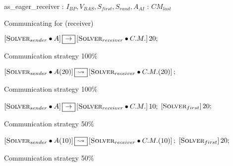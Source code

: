 \begin{algorithm}[t]
\dontprintsemicolon
\SetNoline
{}
   as\_eager\_receiver\;
\algoindent {} : $I_{BP}, V_{BAS}, S_{first}, S_{rand}, A_{AI}$ \;
\algoindent {} : $CM_{last}$
\caption{Communicating \as{} for \SGP{} (receiver)}\label{as:golfers_receiver}
\end{algorithm}

\begin{algorithm}[h]
\dontprintsemicolon
\SetNoline
$\left[\eqsolverposl{sender}\posldot A\right] \onetoone \left[\eqsolverposl{receiver}\posldot C.M.\right]20;$
\caption{Communication strategy \oneTone{} 100\%}\label{comm:golfers_1_1-1}
\end{algorithm}

\begin{algorithm}[h]
\dontprintsemicolon
\SetNoline
$\left[\eqsolverposl{sender}\posldot A(20)\right] \oneton \left[\eqsolverposl{receiver}\posldot C.M.(20)\right];$
\caption{Communication strategy \oneTn{} 100\%}\label{comm:golfers_1_1-n}
\end{algorithm}

\begin{algorithm}
\dontprintsemicolon
\SetNoline
$\left[\eqsolverposl{sender}\posldot A\right] \onetoone \left[\eqsolverposl{receiver}\posldot C.M.\right]10;$\;
$\left[\textbf{{\sc Solver}}_{first}\right]20;$
\caption{Communication strategy \oneTone{} 50\%}\label{comm:golfers_1_1-1_50}
\end{algorithm}

\begin{algorithm}
\dontprintsemicolon
\SetNoline
$\left[\eqsolverposl{sender}\posldot A(10)\right] \oneton \left[\eqsolverposl{receiver}\posldot C.M.(10)\right];$\;
$\left[\textbf{{\sc Solver}}_{first}\right]20;$
\caption{Communication strategy \oneTn{} 50\%}\label{comm:golfers_1_1-n_50}
\end{algorithm}

